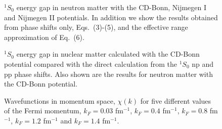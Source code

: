 


\pagestyle{plain}

\begin{figure}[hbtp]
    
    \vspace{2cm}
    \caption{$^1S_0$ energy gap in neutron matter with the CD-Bonn, 
             Nijmegen I and Nijmegen II potentials. In addition we 
             show the results obtained from phase shifts only, Eqs.\ (3)-(5), 
             and the effective range approximation of Eq.\ (6).}
\end{figure}

\clearpage
\begin{figure}

    \vspace{2cm}
	\caption{$^1S_0$ energy gap in nuclear matter calculated with  
                 the CD-Bonn potential  
                 compared with the direct calculation from the 
                 $^1S_0$ np and pp phase shifts.  Also shown are the results 
     for neutron matter with the CD-Bonn potential.}
\end{figure}
\clearpage
	
\begin{figure}

    \vspace{2cm}
\caption{Wavefunctions in momentum space, $\chi (k)$ 
         for five different values of the Fermi momentum, 
         $k_F=0.03$ fm$^{-1}$, $k_F=0.4$ fm$^{-1}$, $k_F=0.8$ fm$^{-1}$, 
         $k_F=1.2$ fm$^{-1}$ and $k_F=1.4$ fm$^{-1}$. }
\end{figure}





